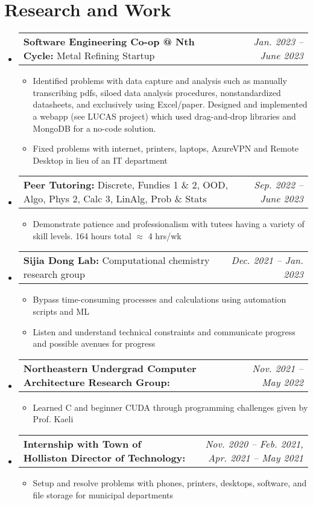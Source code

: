 \documentclass[letterpaper,11pt]{article}
\makeatletter
\newcommand{\resumeBullet}[1]{
  \item\small{
    #1 \vspace{-2pt}
  }
}
\newcommand{\resumeSubheadingThin}[3]{
  \vspace{-1pt}\item
    \begin{tabular*}{0.97\textwidth}[t]{l@{\extracolsep{\fill}}r}
      \small\textbf{#1:} #3 & \small\textit{#2} 
    \end{tabular*}\vspace{-5pt}
}
\newcommand{\resumeSubHeadingListStart}{\begin{itemize}[leftmargin=*]}
\newcommand{\resumeSubHeadingListEnd}{\end{itemize}}
\newcommand{\resumeItemListStart}{\begin{itemize}}
\newcommand{\resumeItemListEnd}{\end{itemize}\vspace{-5pt}}
\makeatother
\begin{document}
  \section{Research and Work}
  \resumeSubHeadingListStart
  \resumeSubheadingThin{Software Engineering Co-op @ Nth Cycle}{Jan. 2023 -- June 2023}{Metal Refining Startup}
  \resumeItemListStart
  \resumeBullet{Identified problems with data capture and analysis such as manually transcribing pdfs, siloed data analysis procedures, nonstandardized datasheets, and exclusively using Excel/paper. Designed and implemented a webapp (see LUCAS project) which used drag-and-drop libraries and MongoDB for a no-code solution. }
  \resumeBullet{Fixed problems with internet, printers, laptops, AzureVPN and Remote Desktop in lieu of an IT department}
  \resumeItemListEnd
  \resumeSubheadingThin{Peer Tutoring}{Sep. 2022 -- June 2023}{Discrete, Fundies 1 \& 2, OOD, Algo, Phys 2, Calc 3, LinAlg, Prob \& Stats}
  \resumeItemListStart
    \resumeBullet{Demonstrate patience and professionalism with tutees having a variety of skill levels. 164 hours total $\approx$ 4 hrs/wk}
  \resumeItemListEnd
  \resumeSubheadingThin{Sijia Dong Lab}{Dec. 2021 -- Jan. 2023}{Computational
  chemistry research group} \resumeItemListStart \resumeBullet{Bypass
  time-consuming processes and calculations using automation scripts and ML}
  \resumeBullet{Listen and understand technical constraints and communicate
  progress and possible avenues for progress} \resumeItemListEnd
  \resumeSubheadingThin{Northeastern Undergrad Computer Architecture Research Group}{Nov. 2021 -- May 2022}{} \resumeItemListStart \resumeBullet{Learned C and beginner CUDA through programming challenges given by Prof. Kaeli}
  \resumeItemListEnd
  \resumeSubheadingThin{Internship with Town of Holliston Director of Technology}{Nov. 2020 -- Feb. 2021, Apr. 2021 -- May 2021}{}
  \resumeItemListStart
    \resumeBullet{Setup and resolve problems with phones, printers, desktops, software, and file storage for municipal departments}
  \resumeItemListEnd \resumeSubHeadingListEnd
\end{document}
